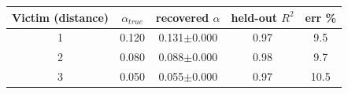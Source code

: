 \begin{tabular}{ccccc}
\toprule
Victim (distance) & $\alpha_{true}$ & recovered $\alpha$ & held-out $R^2$ & err \% \\
\midrule
1 & 0.120 & 0.131$\pm$0.000 & 0.97 & 9.5 \\
2 & 0.080 & 0.088$\pm$0.000 & 0.98 & 9.7 \\
3 & 0.050 & 0.055$\pm$0.000 & 0.97 & 10.5 \\
\bottomrule
\end{tabular}
